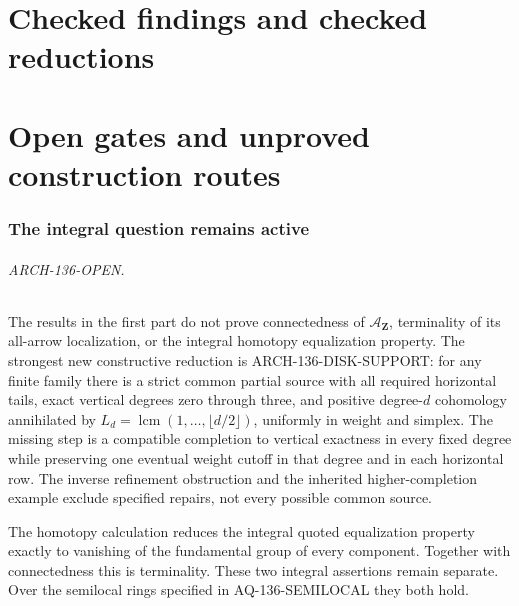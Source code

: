 \documentclass[11pt,a4paper]{article}
\begin{document}
\part{Checked findings and checked reductions}













\clearpage
\part{Open gates and unproved construction routes}
\section{The integral question remains active}
\paragraph{ARCH-136-OPEN.}
The results in the first part do not prove connectedness of
$\mathcal A_{\mathbf Z}$, terminality of its all-arrow localization,
or the integral homotopy equalization property. The strongest new
constructive reduction is ARCH-136-DISK-SUPPORT: for any finite family
there is a strict common partial source with all required horizontal
tails, exact vertical degrees zero through three, and positive
degree-$d$ cohomology annihilated by
$L_d=\operatorname{lcm}(1,\ldots,\lfloor d/2\rfloor)$, uniformly in
weight and simplex. The missing step is a compatible completion to
vertical exactness in every fixed degree while preserving one eventual
weight cutoff in that degree and in each horizontal row. The inverse
refinement obstruction and the inherited higher-completion example
exclude specified repairs, not every possible common source.

The homotopy calculation reduces the integral quoted equalization
property exactly to vanishing of the fundamental group of every
component. Together with connectedness this is terminality. These
two integral assertions remain separate. Over the semilocal rings
specified in AQ-136-SEMILOCAL they both hold.
\end{document}
